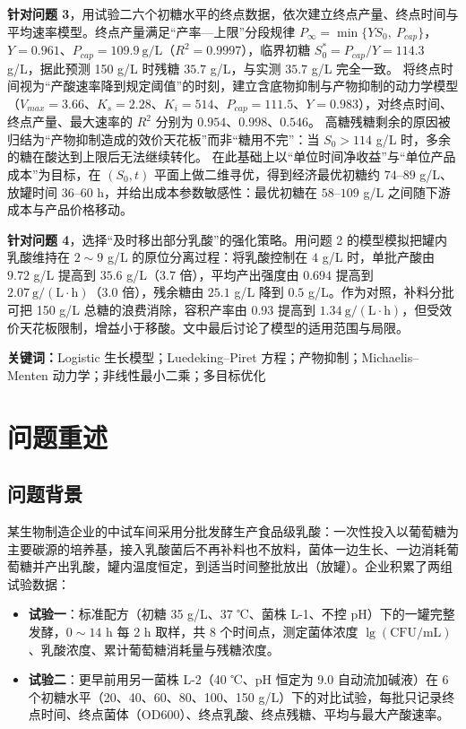 \documentclass[12pt,a4paper]{ctexart}
\newcommand{\wj}[1]{\textbf{#1}}
\begin{document}
\wj{针对问题 3}，用试验二六个初糖水平的终点数据，依次建立终点产量、终点时间与平均速率模型。终点产量满足“产率—上限”分段规律
$P_\infty=\min\{Y S_0,\ P_{cap}\}$，$Y=0.961$、$P_{cap}=109.9\ \mathrm{g/L}$（$R^2=0.9997$），临界初糖 $S_0^*=P_{cap}/Y=114.3$ g/L，据此预测 150 g/L 时残糖 $35.7$ g/L，与实测 $35.7$ g/L 完全一致。
将终点时间视为“产酸速率降到规定阈值”的时刻，建立含底物抑制与产物抑制的动力学模型（$V_{max}=3.66$、$K_s=2.28$、$K_i=514$、$P_{cap}=111.5$、$Y=0.983$），对终点时间、终点产量、最大速率的 $R^2$ 分别为 $0.954$、$0.998$、$0.546$。
高糖残糖剩余的原因被归结为“产物抑制造成的效价天花板”而非“糖用不完”：当 $S_0>114$ g/L 时，多余的糖在酸达到上限后无法继续转化。
在此基础上以“单位时间净收益”与“单位产品成本”为目标，在 $(S_0,t)$ 平面上做二维寻优，得到经济最优初糖约 $74$--$89$ g/L、放罐时间 $36$--$60$ h，并给出成本参数敏感性：最优初糖在 $58$--$109$ g/L 之间随下游成本与产品价格移动。

\wj{针对问题 4}，选择“及时移出部分乳酸”的强化策略。用问题 2 的模型模拟把罐内乳酸维持在 $2\sim9$ g/L 的原位分离过程：将乳酸控制在 $4$ g/L 时，单批产酸由 $9.72$ g/L 提高到 $35.6$ g/L（$3.7$ 倍），平均产出强度由 $0.694$ 提高到 $2.07\ \mathrm{g/(L\cdot h)}$（$3.0$ 倍），残余糖由 $25.1$ g/L 降到 $0.5$ g/L。作为对照，补料分批可把 150 g/L 总糖的浪费消除，容积产率由 0.93 提高到 $1.34\ \mathrm{g/(L\cdot h)}$，但受效价天花板限制，增益小于移酸。文中最后讨论了模型的适用范围与局限。

\vspace{0.6em}
\noindent\wj{关键词：}Logistic 生长模型；Luedeking--Piret 方程；产物抑制；Michaelis--Menten 动力学；非线性最小二乘；多目标优化

\newpage
\tableofcontents
\newpage

\section{问题重述}

\subsection{问题背景}
某生物制造企业的中试车间采用分批发酵生产食品级乳酸：一次性投入以葡萄糖为主要碳源的培养基，接入乳酸菌后不再补料也不放料，菌体一边生长、一边消耗葡萄糖并产出乳酸，罐内温度恒定，到适当时间整批放出（放罐）。企业积累了两组试验数据：

\begin{itemize}[leftmargin=2em,itemsep=0.1em]
\item \wj{试验一}：标准配方（初糖 35 g/L、37 ℃、菌株 L-1、不控 pH）下的一罐完整发酵，$0\sim14$ h 每 2 h 取样，共 8 个时间点，测定菌体浓度 $\lg(\mathrm{CFU/mL})$、乳酸浓度、累计葡萄糖消耗量与残糖浓度。
\item \wj{试验二}：更早前用另一菌株 L-2（40 ℃、pH 恒定为 9.0 自动流加碱液）在 6 个初糖水平（20、40、60、80、100、150 g/L）下的对比试验，每批只记录终点时间、终点菌体（OD600）、终点乳酸、终点残糖、平均与最大产酸速率。
\end{itemize}
\end{document}
